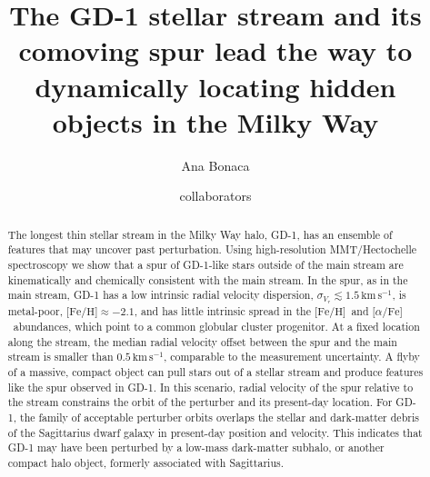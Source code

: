 \documentclass[twocolumn]{aastex63}
\newcommand{\kms}{\ensuremath{\textrm{km}\,\textrm{s}^{-1}}}
\newcommand{\feh}{\ensuremath{\textrm{[Fe/H]}}}
\newcommand{\afe}{\ensuremath{\textrm{[$\alpha$/Fe]}}}
\begin{document}
\sloppy\sloppypar\raggedbottom\frenchspacing %

\title{The GD-1 stellar stream and its comoving spur lead the way to dynamically locating hidden objects in the Milky Way}


\author[0000-0002-7846-9787]{Ana Bonaca}

\author{collaborators}


% 
% 

\begin{abstract}\noindent %
The longest thin stellar stream in the Milky Way halo, GD-1, has an ensemble of features that may uncover past perturbation.
Using high-resolution MMT/Hectochelle spectroscopy we show that a spur of GD-1-like stars outside of the main stream are kinematically and chemically consistent with the main stream.
In the spur, as in the main stream, GD-1 has a low intrinsic radial velocity dispersion, $\sigma_{V_r}\lesssim1.5\,\kms$, is metal-poor, $\feh\approx-2.1$, and has little intrinsic spread in the \feh\ and \afe\ abundances, which point to a common globular cluster progenitor.
At a fixed location along the stream, the median radial velocity offset between the spur and the main stream is smaller than $0.5\,\kms$, comparable to the measurement uncertainty.
A flyby of a massive, compact object can pull stars out of a stellar stream and produce features like the spur observed in GD-1.
In this scenario, radial velocity of the spur relative to the stream constrains the orbit of the perturber and its present-day location.
For GD-1, the family of acceptable perturber orbits overlaps the stellar and dark-matter debris of the Sagittarius dwarf galaxy in present-day position and velocity.
This indicates that GD-1 may have been perturbed by a low-mass dark-matter subhalo, or another compact halo object, formerly associated with Sagittarius.
\end{abstract}
\end{document}
